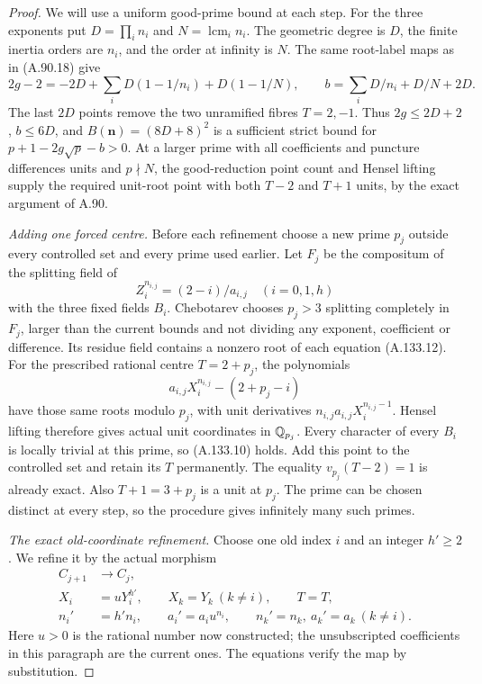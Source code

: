 \begin{proof}
We will use a uniform good-prime bound at each step.
For the three exponents put \(D=\prod_i n_i\) and
\(N=\operatorname{lcm}_i n_i\).
The geometric degree is \(D\), the finite inertia
orders are \(n_i\), and the order at infinity is \(N\).
The same root-label maps as in (A.90.18) give
\[
 2g-2=-2D+\sum_iD(1-1/n_i)+D(1-1/N),\qquad
 b=\sum_iD/n_i+D/N+2D.
\tag{A.133.11}
\]
The last \(2D\) points remove the two unramified fibres
\(T=2,-1\).
Thus \(2g\le2D+2\), \(b\le6D\), and
\(B(\boldsymbol n)=(8D+8)^2\) is a sufficient
strict bound for \(p+1-2g\sqrt p-b>0\).
At a larger prime with all coefficients and
puncture differences units and \(p\nmid N\),
the good-reduction point count and Hensel lifting
supply the required unit-root point with both \(T-2\)
and \(T+1\) units, by the exact argument of A.90.

\emph{Adding one forced centre.}
Before each refinement choose a new prime \(p_j\)
outside every controlled set and every prime used
earlier.  Let \(F_j\) be the compositum of the
splitting field of
\[
          Z_i^{n_{i,j}}=(2-i)/a_{i,j}\quad(i=0,1,h)
\tag{A.133.12}
\]
with the three fixed fields \(B_i\).
Chebotarev chooses \(p_j>3\) splitting completely in
\(F_j\), larger than the current bounds and not
dividing any exponent, coefficient or difference.
Its residue field contains a nonzero root of
each equation (A.133.12).
For the prescribed rational centre \(T=2+p_j\),
the polynomials
\[
             a_{i,j}X_i^{n_{i,j}}-(2+p_j-i)
\tag{A.133.13}
\]
have those same roots modulo \(p_j\), with unit
derivatives \(n_{i,j}a_{i,j}X_i^{n_{i,j}-1}\).
Hensel lifting therefore gives actual unit
coordinates in \(\mathbb Q_{p_j}\).
Every character of every \(B_i\) is locally
trivial at this prime, so (A.133.10) holds.
Add this point to the controlled set and retain
its \(T\) permanently.
The equality \(v_{p_j}(T-2)=1\) is already exact.
Also \(T+1=3+p_j\) is a unit at \(p_j\).
The prime can be chosen distinct at every step,
so the procedure gives infinitely many such primes.

\emph{The exact old-coordinate refinement.}
Choose one old index \(i\) and an integer \(h'\ge2\).
We refine it by the actual morphism
\[
\begin{aligned}
 C_{j+1}&\longrightarrow C_j,\\
 X_i&=uY_i^{h'},\qquad X_k=Y_k\ (k\ne i),\qquad T=T,\\
 n_i'&=h'n_i,\qquad a_i'=a_i u^{n_i},
       \qquad n_k'=n_k,\ a_k'=a_k\ (k\ne i).
\end{aligned}
\tag{A.133.14}
\]
Here \(u>0\) is the rational number now constructed;
the unsubscripted coefficients in this paragraph
are the current ones.
The equations verify the map by substitution.


\end{proof}
